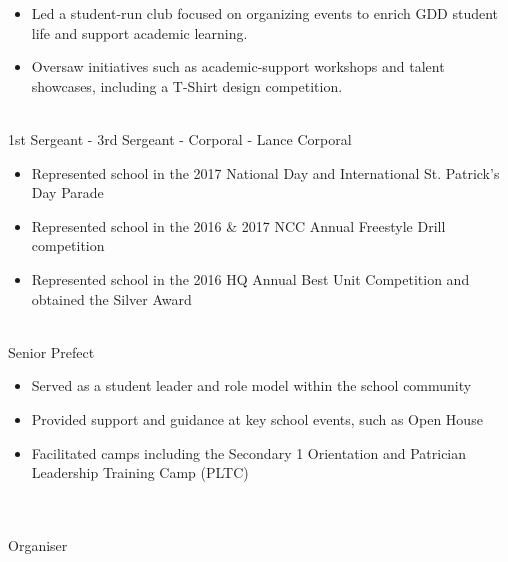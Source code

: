 \documentclass[a4paper,10pt]{article}
\begin{document}
\begin{paracol}{2}
\begin{rightcolumn}
\begin{itemize}[left=0pt, labelsep=0.5em, itemsep=0pt, topsep=0pt, parsep=0pt, partopsep=0pt]
        \item \lato Led a student-run club focused on organizing events to enrich GDD student life and support academic learning.      
        \item \lato Oversaw initiatives such as academic-support workshops and talent showcases, including a T-Shirt design competition.
      \end{itemize}
      \vspace{0.35cm}
      \normalsize{} \hfill\small{}\\
      \latobold 1st Sergeant - 3rd Sergeant - Corporal - Lance Corporal
      \begin{itemize}[left=0pt, labelsep=0.5em, itemsep=0pt, topsep=0pt, parsep=0pt, partopsep=0pt]
        \item \lato Represented school in the 2017 National Day and International St. Patrick's Day Parade
        \item \lato Represented school in the 2016 \& 2017 NCC Annual Freestyle Drill competition
        \item \lato Represented school in the 2016 HQ Annual Best Unit Competition and obtained the Silver Award
      \end{itemize}
      \vspace{0.35cm}
      \normalsize{} \hfill\small{}\\
      \latobold Senior Prefect
      \begin{itemize}[left=0pt, labelsep=0.5em, itemsep=0pt, topsep=0pt, parsep=0pt, partopsep=0pt]
        \item \lato Served as a student leader and role model within the school community
        \item \lato Provided support and guidance at key school events, such as Open House
        \item \lato Facilitated camps including the Secondary 1 Orientation and Patrician Leadership Training Camp (PLTC)
      \end{itemize}
    \vspace{0.35cm}
    \Large\noindent{}
    \vspace{0.15cm}\\
    \normalsize{} \hfill\small{}\\
    \latobold Organiser
    \begin{itemize}[left=0pt, labelsep=0.5em, itemsep=0pt, topsep=0pt, parsep=0pt, partopsep=0pt]

\end{itemize}
\end{rightcolumn}
\end{paracol}
\end{document}
